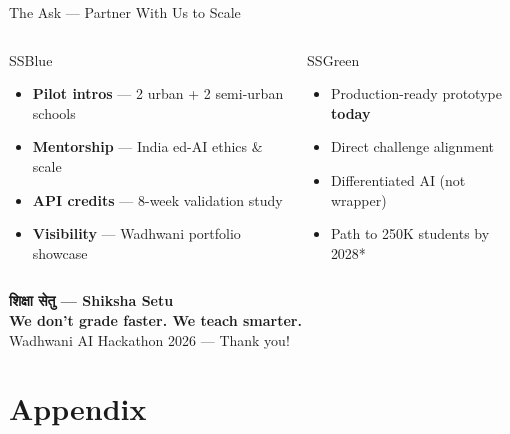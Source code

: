 \documentclass[aspectratio=169,10pt]{beamer}
\begin{document}
\begin{frame}{The Ask — Partner With Us to Scale}
  \begin{columns}
    \begin{callout}[title={What we need from Wadhwani}]{SSBlue}
      \footnotesize
      \begin{itemize}\setlength\itemsep{0.12em}
        \item \textbf{Pilot intros} — 2 urban + 2 semi-urban schools
        \item \textbf{Mentorship} — India ed-AI ethics \& scale
        \item \textbf{API credits} — 8-week validation study
        \item \textbf{Visibility} — Wadhwani portfolio showcase
      \end{itemize}
    \end{callout}

    \begin{callout}[title={What you get}]{SSGreen}
      \footnotesize
      \begin{itemize}\setlength\itemsep{0.12em}
        \item Production-ready prototype \textbf{today}
        \item Direct challenge alignment
        \item Differentiated AI (not wrapper)
        \item Path to 250K students by 2028*
      \end{itemize}
    \end{callout}
  \end{columns}

  \vspace{0.3cm}
  \centering
  \begin{tcolorbox}[enhanced,colback=SSGradA,colframe=SSGradA,coltext=white,
    halign=center,width=0.9\textwidth,arc=12pt,boxrule=0pt,drop shadow]
    {\LARGE\bfseries शिक्षा सेतु — Shiksha Setu}\\[0.15cm]
    {\large\textbf{We don't grade faster. We teach smarter.}}\\[0.1cm]
    Wadhwani AI Hackathon 2026 — Thank you!
  \end{tcolorbox}
\end{frame}

\appendix
\section*{Appendix}
\end{document}
